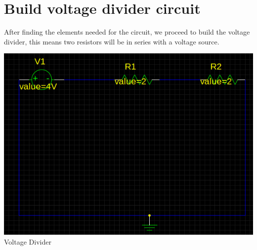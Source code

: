\documentclass{article}
\begin{document}
\section{Build voltage divider circuit}
After finding the elements needed for the circuit, we proceed to build the voltage divider, this means two resistors will be in series with a voltage source.
\begin{center}
    \includegraphics[width=.95\textwidth]{Voldiv.png}\\
    Voltage Divider
\end{center}
\end{document}
